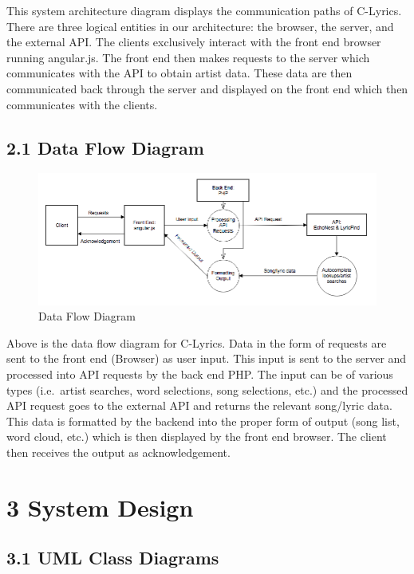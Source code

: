\documentclass[]{article}
\begin{document}
This system architecture diagram displays the communication paths of
C-Lyrics. There are three logical entities in our architecture: the
browser, the server, and the external API. The clients exclusively
interact with the front end browser running angular.js. The front end
then makes requests to the server which communicates with the API to
obtain artist data. These data are then communicated back through the
server and displayed on the front end which then communicates with the
clients.

\subsection{2.1 Data Flow Diagram}\label{data-flow-diagram}

\begin{figure}[htbp]
\centering
\includegraphics{data_flow.png}
\caption{Data Flow Diagram}
\end{figure}

Above is the data flow diagram for C-Lyrics. Data in the form of
requests are sent to the front end (Browser) as user input. This input
is sent to the server and processed into API requests by the back end
PHP. The input can be of various types (i.e.~artist searches, word
selections, song selections, etc.) and the processed API request goes to
the external API and returns the relevant song/lyric data. This data is
formatted by the backend into the proper form of output (song list, word
cloud, etc.) which is then displayed by the front end browser. The
client then receives the output as acknowledgement.

\section{3 System Design}\label{system-design}

\subsection{3.1 UML Class Diagrams}\label{uml-class-diagrams}
\end{document}

